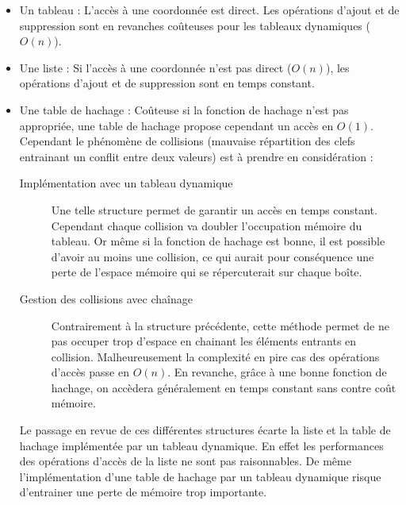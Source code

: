 \begin{itemize}
\item
  Un tableau : L'accès à une coordonnée est direct. Les opérations d'ajout et de suppression sont en revanches coûteuses pour les tableaux dynamiques ($O(n)$).
\item
  Une liste : Si l'accès à une coordonnée n'est pas direct ($O(n)$), les opérations d'ajout et de suppression sont en temps constant.
\item
  Une table de hachage : Coûteuse si la fonction de hachage n'est pas appropriée, une table de hachage propose cependant un accès en $O(1)$.  Cependant le phénomène de collisions (mauvaise répartition des clefs entrainant un conflit entre deux valeurs) est à prendre en considération :

\begin{description}
\item[Implémentation avec un tableau dynamique] Une telle structure permet de garantir un accès en temps constant. Cependant chaque collision va doubler l'occupation mémoire du tableau. Or même si la fonction de hachage est bonne, il est possible d'avoir au moins une collision, ce qui aurait pour conséquence une perte de l'espace mémoire qui se répercuterait sur chaque boîte.
\item[Gestion des collisions avec chaînage] Contrairement à la structure précédente, cette méthode permet de ne pas occuper trop d'espace en chainant les éléments entrants en collision. Malheureusement la complexité en pire cas des opérations d'accès passe en $O(n)$. En revanche, grâce à une bonne fonction de hachage, on accèdera généralement en temps constant sans contre coût mémoire. 
\end{description}

Le passage en revue de ces différentes structures écarte la liste et la table de hachage implémentée par un tableau dynamique. En effet les performances des opérations d'accès de la liste ne sont pas raisonnables. De même l'implémentation d'une table de hachage par un tableau dynamique risque d'entrainer une perte de mémoire trop importante.

\end{itemize}


